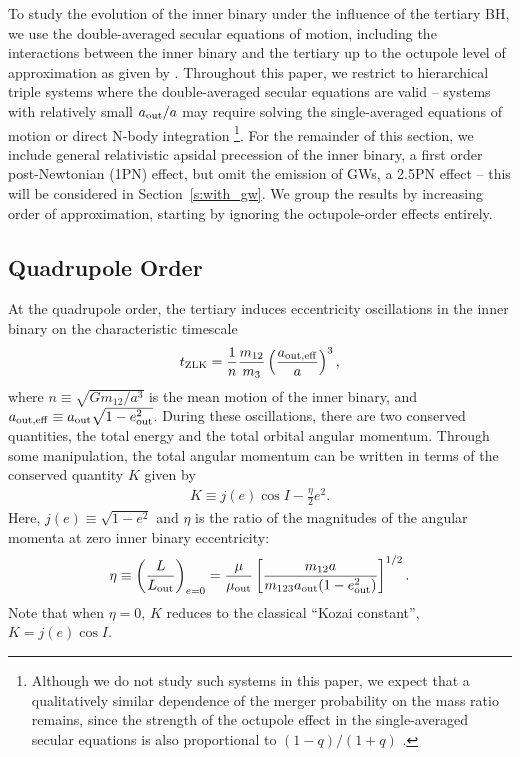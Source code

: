 \documentclass[
        fleqn,
        usenatbib,
    ]{mnras}
\newcommand*{\p}[1]{\left(#1\right)}
\newcommand*{\s}[1]{\left[#1\right]}
\begin{document}
To study the evolution of the inner binary under the influence of the tertiary
BH, we use the double-averaged secular equations of motion, including the
interactions between the inner binary and the tertiary up to the octupole level
of approximation as given by \citet{LML15}. Throughout this paper, we restrict
to hierarchical triple systems where the double-averaged secular equations are
valid -- systems %
with relatively small $a_{\rm out}/a$ may require solving the
single-averaged equations of motion or direct N-body integration
\citep[see][]{Antonini_2012, Antonini_2014, LuoKatzDong, LeiCirciOrtore,
bin_misc5, LL19, Hamers}\footnote{ Although we do not study such systems in this
paper, we expect that a qualitatively similar dependence of the merger
probability on the mass ratio remains, since the strength of the octupole effect
in the single-averaged secular equations is also proportional to $(1-q)/(1+q)$
\citep[see Eq.~25 of][]{bin_misc5}.}. For the remainder of this section, we
include general relativistic apsidal precession of the inner binary, a first
order post-Newtonian (1PN) effect, but omit the emission of GWs, a 2.5PN
effect -- this %
will be considered in Section~\ref{s:with_gw}. We group the results by
increasing order of approximation, starting by ignoring the octupole-order
effects entirely.

\subsection{Quadrupole Order}

At the quadrupole order, the tertiary induces eccentricity oscillations in the
inner binary on the characteristic timescale
\begin{align}
    t_{\rm ZLK} = \frac{1}{n}\frac{m_{12}}{m_3}
            \p{\frac{a_{\rm out, eff}}{a}}^3,\label{eq:def_tzlk}
\end{align}
where $n \equiv \sqrt{Gm_{12} / a^3}$ is the mean motion of the inner binary,
and $a_{\rm out, eff} \equiv a_{\rm out}\sqrt{1 - e_{\rm out}^2}$. During these
oscillations, there are two conserved quantities, the total energy and the total
orbital angular momentum. Through some manipulation, the total angular momentum
can be written in terms of the conserved quantity $K$ given by
\begin{align}
    K \equiv j(e) \cos I - \frac{\eta}{2}e^2.\label{eq:def_K}
\end{align}
Here, $j(e) \equiv \sqrt{1 - e^2}$ and $\eta$ is the ratio of the magnitudes of
the angular momenta at zero inner binary eccentricity:
\begin{align}
    \eta \equiv \p{\frac{L}{L_{\rm out}}}_{e = 0}
        = \frac{\mu}{\mu_{\rm out}}\s{\frac{m_{12}a}
            {m_{123}a_{\rm out}(1 - e_{\rm out}^2)}}^{1/2}.\label{eq:def_eta}
\end{align}
Note that when $\eta = 0$, $K$ reduces to the classical ``Kozai constant'', $K =
j(e) \cos I$.
\end{document}
